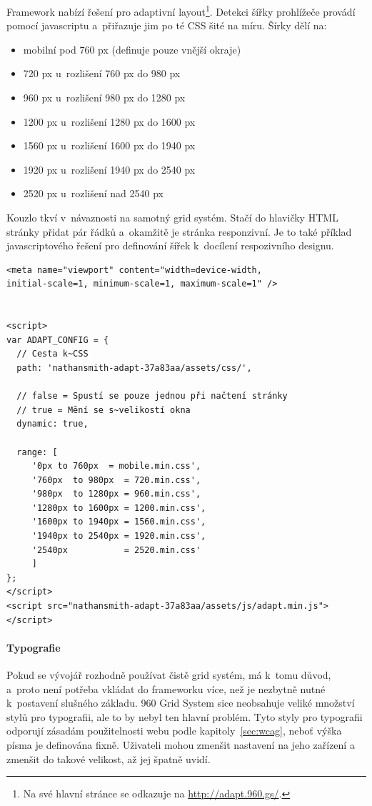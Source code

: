 \documentclass[thesis=B,czech]{FITthesis}[2012/06/26]
\begin{document}
Framework nabízí řešení pro adaptivní layout\footnote{Na své hlavní stránce se odkazuje na \url{http://adapt.960.gs/}.}. Detekci šířky prohlížeče provádí pomocí javascriptu a~přiřazuje jim po té \gls{CSS} šité na míru. Šírky dělí na:

\begin{itemize}
 \item mobilní pod 760 px
(definuje pouze vnější okraje)
 \item 720 px u~rozlišení 760 px do 980 px
 \item 960 px u~rozlišení 980 px do 1280 px
 \item 1200 px u~rozlišení 1280 px do 1600 px
 \item 1560 px u~rozlišení 1600 px do 1940 px
 \item 1920 px u~rozlišení 1940 px do 2540 px
 \item 2520 px u~rozlišení nad 2540 px 
\end{itemize}

Kouzlo tkví v~návaznosti na samotný grid  systém. Stačí do hlavičky \gls{HTML} stránky přidat pár řádků a~okamžitě je stránka responzivní. Je to také příklad javascriptového řešení pro definování šířek k~docílení respozivního designu.
\scriptsize
\begin{verbatim}
<meta name="viewport" content="width=device-width, 
initial-scale=1, minimum-scale=1, maximum-scale=1" />


<script>
var ADAPT_CONFIG = {
  // Cesta k~CSS
  path: 'nathansmith-adapt-37a83aa/assets/css/',
  
  // false = Spustí se pouze jednou při načtení stránky
  // true = Mění se s~velikostí okna
  dynamic: true,
  
  range: [
     '0px to 760px  = mobile.min.css',
     '760px  to 980px  = 720.min.css',
     '980px  to 1280px = 960.min.css',
     '1280px to 1600px = 1200.min.css',
     '1600px to 1940px = 1560.min.css',
     '1940px to 2540px = 1920.min.css',
     '2540px           = 2520.min.css'
     ]
};
</script>
<script src="nathansmith-adapt-37a83aa/assets/js/adapt.min.js"></script>
\end{verbatim}
\normalsize


\paragraph{Typografie}
 Pokud se vývojář rozhodně používat čistě grid  systém, má k~tomu důvod, a~proto není potřeba vkládat do frameworku více, než je nezbytně nutné k~postavení slušného základu. 960 Grid System sice neobsahuje veliké množství stylů pro typografii, ale to by nebyl ten hlavní problém. Tyto styly pro typografii odporují zásadám použitelnosti webu podle kapitoly~\ref{sec:wcag}, neboť výška písma je definována fixně. Uživateli mohou zmenšit nastavení na jeho zařízení a zmenšit do takové velikost, až jej špatně uvidí.
\end{document}
